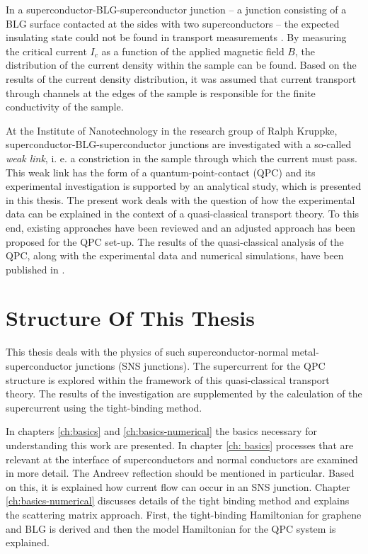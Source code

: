 In a superconductor-BLG-superconductor junction -- a junction consisting of a BLG surface contacted at the sides with two superconductors -- the expected insulating state could not be found in transport measurements \cite{Zhu2017}. By measuring the critical current $I_c$ as a function of the applied magnetic field $B$, the distribution of the current density within the sample can be found. Based on the results of the current density distribution, it was assumed that current transport through channels at the edges of the sample is responsible for the finite conductivity of the sample. 

At the Institute of Nanotechnology in the research group of Ralph Kruppke, superconductor-BLG-superconductor junctions are investigated with a so-called \emph{weak link}, i. e. a constriction in the sample through which the current must pass. This weak link has the form of a quantum-point-contact (QPC) and its experimental investigation is supported by an analytical study, which is presented in this thesis. The present work deals with the question of how the experimental data can be explained in the context of a quasi-classical transport theory. To this end, existing approaches have been reviewed and an adjusted approach has been proposed for the QPC set-up. The results of the quasi-classical analysis of the QPC, along with the experimental data and numerical simulations, have been published in \cite{Craft2017}.

\section*{Structure Of This Thesis}

This thesis deals with the physics of such superconductor-normal metal-superconductor junctions (SNS junctions). The supercurrent for the QPC structure is explored within the framework of this quasi-classical transport theory. The results of the investigation are supplemented by the calculation of the supercurrent using the tight-binding method.

In chapters \ref{ch:basics} and \ref{ch:basics-numerical} the basics necessary for understanding this work are presented. In chapter \ref{ch: basics} processes that are relevant at the interface of superconductors and normal conductors are examined in more detail. The Andreev reflection should be mentioned in particular. Based on this, it is explained how current flow can occur in an SNS junction. Chapter \ref{ch:basics-numerical} discusses details of the tight binding method and explains the scattering matrix approach. First, the tight-binding Hamiltonian for graphene and BLG is derived and then the model Hamiltonian for the QPC system is explained. 

